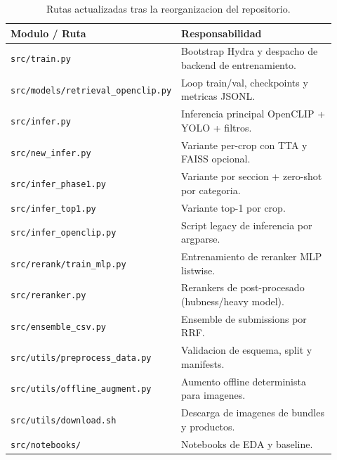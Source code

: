 \begin{table}[h]
  \centering
  \small
  \begin{tabular}{p{0.40\linewidth} p{0.52\linewidth}}
    \toprule
    \textbf{Modulo / Ruta} & \textbf{Responsabilidad} \\
    \midrule
    \texttt{src/train.py} & Bootstrap Hydra y despacho de backend de entrenamiento. \\
    \texttt{src/models/retrieval\_openclip.py} & Loop train/val, checkpoints y metricas JSONL. \\
    \texttt{src/infer.py} & Inferencia principal OpenCLIP + YOLO + filtros. \\
    \texttt{src/new\_infer.py} & Variante per-crop con TTA y FAISS opcional. \\
    \texttt{src/infer\_phase1.py} & Variante por seccion + zero-shot por categoria. \\
    \texttt{src/infer\_top1.py} & Variante top-1 por crop. \\
    \texttt{src/infer\_openclip.py} & Script legacy de inferencia por argparse. \\
    \texttt{src/rerank/train\_mlp.py} & Entrenamiento de reranker MLP listwise. \\
    \texttt{src/reranker.py} & Rerankers de post-procesado (hubness/heavy model). \\
    \texttt{src/ensemble\_csv.py} & Ensemble de submissions por RRF. \\
    \texttt{src/utils/preprocess\_data.py} & Validacion de esquema, split y manifests. \\
    \texttt{src/utils/offline\_augment.py} & Aumento offline determinista para imagenes. \\
    \texttt{src/utils/download.sh} & Descarga de imagenes de bundles y productos. \\
    \texttt{src/notebooks/} & Notebooks de EDA y baseline. \\
    \bottomrule
  \end{tabular}
  \caption{Rutas actualizadas tras la reorganizacion del repositorio.}
  \label{tab:code-map}
\end{table}
